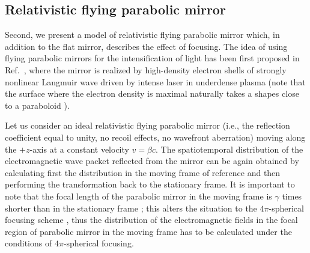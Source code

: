 \documentclass[10pt, a4paper, twoside, openright]{report}
\begin{document}
\subsection{Relativistic flying parabolic mirror\label{sec:rfpm}}


Second, we present a model of relativistic flying parabolic mirror which, in addition to the flat mirror, describes the effect of focusing. The idea of using flying parabolic mirrors for the intensification of light has been first proposed in Ref.~\cite{Bulanov2003}, where the mirror is realized by high-density electron shells of strongly nonlinear Langmuir wave driven by intense laser in underdense plasma (note that the surface where the electron density is maximal naturally takes a shapes close to a paraboloid \cite{Bulanov1991, Bulanov1995, Matlis2006, Shadwick2002, Maksimchuk2008}).

Let us consider an ideal relativistic flying parabolic mirror (i.e., the reflection coefficient equal to unity, no recoil effects, no wavefront aberration) moving along the $ +z $-axis at a constant velocity $ v = \beta c $. The spatiotemporal distribution of the electromagnetic wave packet reflected from the mirror can be again obtained by calculating first the distribution in the moving frame of reference and then performing the transformation back to the stationary frame. It is important to note that the focal length of the parabolic mirror in the moving frame is $ \gamma $ times shorter than in the stationary frame \cite{Bulanov2011, Jeong2021}; this alters the situation to the $ 4 \pi $-spherical focusing scheme \cite{Gonoskov2012, Jeong2020}, thus the distribution of the electromagnetic fields in the focal region of parabolic mirror in the moving frame has to be calculated under the conditions of $ 4 \pi $-spherical focusing.
\end{document}
